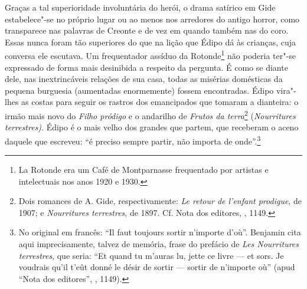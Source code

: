 Graças a tal superioridade involuntária do herói, o drama satírico em
Gide estabelece"-se no próprio lugar ou ao menos nos arredores do antigo
horror, como transparece nas palavras de Creonte e de vez em quando
também nas do coro. Essas nunca foram tão superiores do que na lição que
Édipo dá às crianças, cuja conversa ele escutava. Um frequentador
assíduo da Rotonde\footnote{La Rotonde era um Café de Montparnasse
  frequentado por artistas e intelectuais nos anos 1920 e 1930. \versal{[N. E.]}} não
poderia ter"-se expressado de forma mais desinibida a respeito da
pergunta. É como se diante dele, nas inextrincáveis relações de sua
casa, todas as misérias domésticas da pequena burguesia (aumentadas
enormemente) fossem encontradas. Édipo vira"-lhes as costas para seguir
os rastros dos emancipados que tomaram a dianteira: o irmão mais novo do
\emph{Filho pródigo} e o andarilho de \emph{Frutos da terra}\footnote{Dois romances de A. Gide, respectivamente: \emph{Le retour de l'enfant
  prodigue}, de 1907; e \emph{Nourritures terrestres}, de 1897. Cf. Nota
  dos editores, , 1149. \versal{[N. E.]}} (\emph{Nourritures terrestres)}. Édipo é o
mais velho dos grandes que partem, que receberam o aceno daquele que
escreveu: ``é preciso sempre partir, não importa de onde''.\footnote{No original em francês: ``Il faut toujours sortir n'importe d'où''.
  Benjamin cita aqui imprecisamente, talvez de memória, frase do
  prefácio de \emph{Les Nourritures terrestres}, que seria: ``Et quand
  tu m'auras lu, jette ce livre --- et sors. Je voudrais qu'il t'eût
  donné le désir de sortir --- sortir de n'importe où'' (apud ``Nota dos
  editores'', , 1149). \versal{[N. T.]}}
